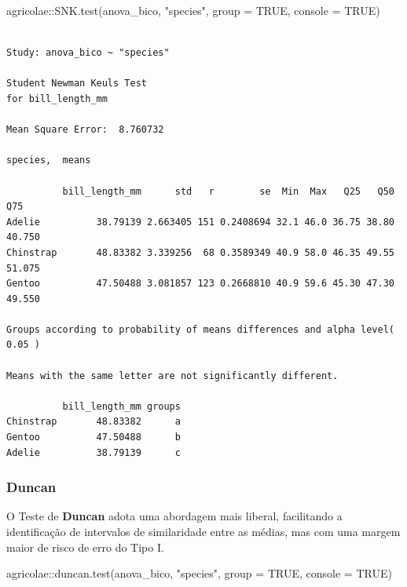 \documentclass[
  letterpaper,
  DIV=11,
  numbers=noendperiod,
  oneside]{scrartcl}
\newenvironment{Shaded}{\begin{snugshade}}{\end{snugshade}}
\newcommand{\AttributeTok}[1]{\textcolor[rgb]{0.40,0.45,0.13}{#1}}
\newcommand{\ConstantTok}[1]{\textcolor[rgb]{0.56,0.35,0.01}{#1}}
\newcommand{\FunctionTok}[1]{\textcolor[rgb]{0.28,0.35,0.67}{#1}}
\newcommand{\NormalTok}[1]{\textcolor[rgb]{0.00,0.23,0.31}{#1}}
\newcommand{\SpecialCharTok}[1]{\textcolor[rgb]{0.37,0.37,0.37}{#1}}
\newcommand{\StringTok}[1]{\textcolor[rgb]{0.13,0.47,0.30}{#1}}
\begin{document}
\begin{Shaded}
\begin{Highlighting}[]
\NormalTok{agricolae}\SpecialCharTok{::}\FunctionTok{SNK.test}\NormalTok{(anova\_bico, }\StringTok{"species"}\NormalTok{, }\AttributeTok{group =} \ConstantTok{TRUE}\NormalTok{, }\AttributeTok{console =} \ConstantTok{TRUE}\NormalTok{)}
\end{Highlighting}
\end{Shaded}

\begin{verbatim}

Study: anova_bico ~ "species"

Student Newman Keuls Test
for bill_length_mm 

Mean Square Error:  8.760732 

species,  means

          bill_length_mm      std   r        se  Min  Max   Q25   Q50    Q75
Adelie          38.79139 2.663405 151 0.2408694 32.1 46.0 36.75 38.80 40.750
Chinstrap       48.83382 3.339256  68 0.3589349 40.9 58.0 46.35 49.55 51.075
Gentoo          47.50488 3.081857 123 0.2668810 40.9 59.6 45.30 47.30 49.550

Groups according to probability of means differences and alpha level( 0.05 )

Means with the same letter are not significantly different.

          bill_length_mm groups
Chinstrap       48.83382      a
Gentoo          47.50488      b
Adelie          38.79139      c
\end{verbatim}

\subsubsection{Duncan}\label{duncan}

O Teste de \textbf{Duncan} adota uma abordagem mais liberal, facilitando
a identificação de intervalos de similaridade entre as médias, mas com
uma margem maior de risco de erro do Tipo I.

\begin{Shaded}
\begin{Highlighting}[]
\NormalTok{agricolae}\SpecialCharTok{::}\FunctionTok{duncan.test}\NormalTok{(anova\_bico, }\StringTok{"species"}\NormalTok{, }\AttributeTok{group =} \ConstantTok{TRUE}\NormalTok{, }\AttributeTok{console =} \ConstantTok{TRUE}\NormalTok{)}
\end{Highlighting}
\end{Shaded}
\end{document}
